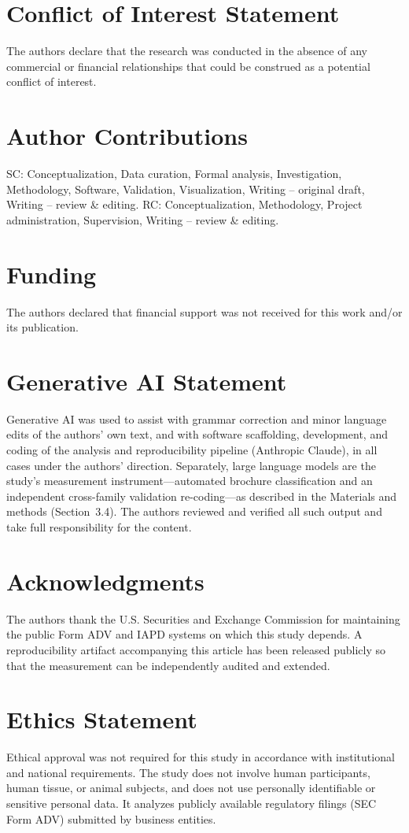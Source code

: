 \documentclass[utf8]{FrontiersinHarvard}
\begin{document}
\section*{Conflict of Interest Statement}
The authors declare that the research was conducted in the absence of any commercial or financial relationships that could be construed as a potential conflict of interest.

\section*{Author Contributions}
SC: Conceptualization, Data curation, Formal analysis, Investigation, Methodology, Software, Validation, Visualization, Writing -- original draft, Writing -- review \& editing. RC: Conceptualization, Methodology, Project administration, Supervision, Writing -- review \& editing.

\section*{Funding}
The authors declared that financial support was not received for this work and/or its publication.

\section*{Generative AI Statement}
Generative AI was used to assist with grammar correction and minor language edits of the authors' own text, and with software scaffolding, development, and coding of the analysis and reproducibility pipeline (Anthropic Claude), in all cases under the authors' direction. Separately, large language models are the study's measurement instrument---automated brochure classification and an independent cross-family validation re-coding---as described in the Materials and methods (Section~3.4). The authors reviewed and verified all such output and take full responsibility for the content.

\section*{Acknowledgments}
The authors thank the U.S. Securities and Exchange Commission for maintaining the public Form ADV and IAPD systems on which this study depends. A reproducibility artifact accompanying this article has been released publicly so that the measurement can be independently audited and extended.

\section*{Ethics Statement}
Ethical approval was not required for this study in accordance with institutional and national requirements. The study does not involve human participants, human tissue, or animal subjects, and does not use personally identifiable or sensitive personal data. It analyzes publicly available regulatory filings (SEC Form ADV) submitted by business entities.
\end{document}
